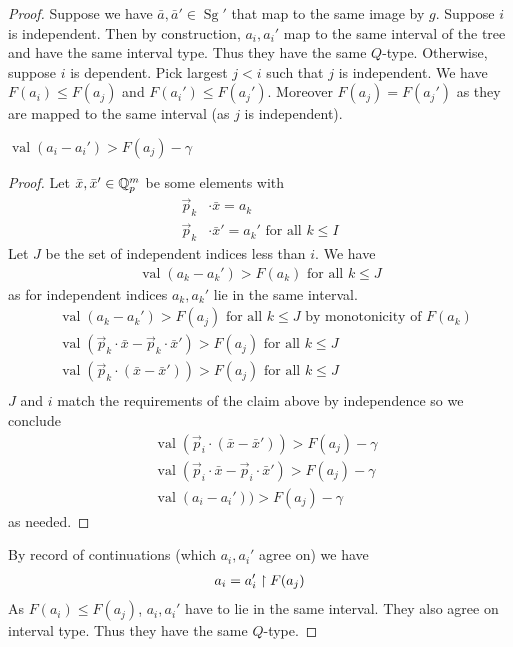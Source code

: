 \documentclass{amsart}
\DeclareMathOperator{\Sg}{Sg}
\DeclareMathOperator{\val}{val}
\begin{document}
\begin{proof}
	Suppose we have $\bar a, \bar a' \in \Sg'$ that map to the same image by $g$.
	Suppose $i$ is independent.
	Then by construction, $a_i, a_i'$ map to the same interval of the tree and have the same interval type.
	Thus they have the same $Q$-type.
	Otherwise, suppose $i$ is dependent.
	Pick largest $j < i$ such that $j$ is independent.
	We have $F(a_i) \leq F(a_j)$ and $F(a_i') \leq F(a_j')$.
	Moreover $F(a_j) = F(a_j')$ as they are mapped to the same interval (as $j$ is independent).
	
	\begin{Claim}
		$\val(a_i - a_i') > F(a_j) - \gamma$
	\end{Claim}
	\begin{proof}
		Let $\bar x, \bar x' \in \mathbb{Q}_p^m$ be some elements with
		\begin{align*}
			\vec p_k &\cdot \bar x = a_k \\
			\vec p_k &\cdot \bar x' = a_k' \text { for all } k \leq I
		\end{align*}
		Let $J$ be the set of independent indices less than $i$.
		We have 
		\begin{align*}
			\val(a_k - a_k') > F(a_k) \text { for all } k \leq J
		\end{align*}
		as for independent indices $a_k, a_k'$ lie in the same interval.
		\begin{align*}
			&\val(a_k - a_k') > F(a_j) \text { for all } k \leq J \text{ by monotonicity of $F(a_k)$} \\
			&\val(\vec p_k \cdot \bar x - \vec p_k \cdot \bar x') > F(a_j) \text { for all } k \leq J \\
			&\val(\vec p_k \cdot (\bar x - \bar x')) > F(a_j) \text { for all } k \leq J \\
		\end{align*}
		$J$ and $i$ match the requirements of the claim above by independence so we conclude
		\begin{align*}
			&\val(\vec p_i \cdot (\bar x - \bar x')) > F(a_j) - \gamma \\
			&\val(\vec p_i \cdot \bar x - \vec p_i \cdot \bar x') > F(a_j) - \gamma \\
			&\val(a_i - a_i')) > F(a_j) - \gamma
		\end{align*}
		as needed.
	\end{proof}
	
	By record of continuations (which $a_i, a_i'$ agree on) we have
	\begin{align*}
		a_i = a_i' \upharpoonright F(a_j)
	\end{align*}
	As $F(a_i) \leq F(a_j)$, $a_i, a_i'$ have to lie in the same interval.
	They also agree on interval type.
	Thus they have the same $Q$-type.
	
\end{proof}
\end{document}
